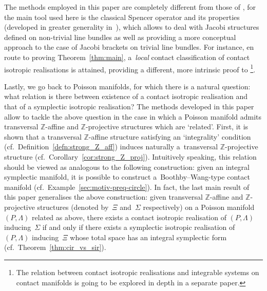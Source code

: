 \documentclass[10pt,a4paper]{amsart}
\numberwithin{equation}{section}
\newcommand{\PM}{(P,\Lambda)} %
\newcommand{\ZZ}{\mathbb{Z}}
\begin{document}
The methods employed in this paper are completely dif\/ferent from those of \cite{Banyaga,dd,jovanovic,lerman_contact_toric,wolbert}, for the main tool used here is the classical Spencer operator and its properties (developed in greater generality in~\cite{Maria}), which allows to deal with Jacobi structures def\/ined on non-trivial line bundles as well as providing a more conceptual approach to the case of Jacobi brackets on trivial line bundles. For instance, en route to proving Theorem~\ref{thm:main}, a~{\it local} contact classif\/ication of contact isotropic realisations is attained, providing a dif\/ferent, more intrinsic proof to \cite[Theorem~4]{jovanovic}\footnote{The relation between contact isotropic realisations and integrable systems on contact manifolds is going to be explored in depth in a separate paper.}.

Lastly, we go back to Poisson manifolds, for which there is a natural question: what relation is there between existence of a contact isotropic realisation and that of a symplectic isotropic realisation? The methods developed in this paper allow to tackle the above question in the case in which a Poisson manifold admits transversal $\ZZ$-af\/f\/ine and $\ZZ$-projective structures which are `related'. First, it is shown that a transversal $\ZZ$-af\/f\/ine structure satisfying an `integrality' condition (cf.\ Def\/inition~\ref{defn:strong_Z_aff}) induces naturally a~transversal $\ZZ$-projective structure (cf.\ Corollary~\ref{cor:strong_Z_proj}). Intuitively speaking, this relation should be viewed as analogous to the following construction: given an integral symplectic manifold, it is possible to construct a~Boothby--Wang-type contact manifold (cf.\ Example~\ref{sec:motiv-preq-circle}). In fact, the last main result of this paper generalises the above construction: given transversal $\ZZ$-af\/f\/ine and $\ZZ$-projective structures (denoted by~$\Xi$ and~$\Sigma$ respectively) on a Poisson manifold $\PM$ related as above, there exists a contact isotropic reali\-sa\-tion of $\PM$ inducing~$\Sigma$ if and only if there exists a symplectic isotropic reali\-sa\-tion of~$\PM$ inducing~$\Xi$ whose total space has an integral symplectic form (cf.\ Theorem~\ref{thm:cir_vs_sir}).
\end{document}
